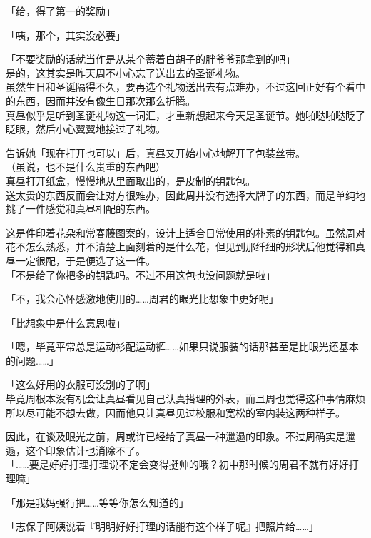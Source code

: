 「给，得了第一的奖励」

「咦，那个，其实没必要」

「不要奖励的话就当作是从某个蓄着白胡子的胖爷爷那拿到的吧」\\

是的，这其实是昨天周不小心忘了送出去的圣诞礼物。\\

虽然生日和圣诞隔得不久，要再选个礼物送出去有点难办，不过这回正好有个看中的东西，因而并没有像生日那次那么折腾。\\

真昼似乎是听到圣诞礼物这一词汇，才重新想起来今天是圣诞节。她啪哒啪哒眨了眨眼，然后小心翼翼地接过了礼物。

告诉她「现在打开也可以」后，真昼又开始小心地解开了包装丝带。\\

（虽说，也不是什么贵重的东西吧）\\

真昼打开纸盒，慢慢地从里面取出的，是皮制的钥匙包。\\

送太贵的东西反而会让对方很难办，因此周并没有选择大牌子的东西，而是单纯地挑了一件感觉和真昼相配的东西。

这是件印着花朵和常春藤图案的，设计上适合日常使用的朴素的钥匙包。虽然周对花不怎么熟悉，并不清楚上面刻着的是什么花，但见到那纤细的形状后他觉得和真昼一定很配，于是便选了这一件。\\

「不是给了你把多的钥匙吗。不过不用这包也没问题就是啦」

「不，我会心怀感激地使用的……周君的眼光比想象中更好呢」

「比想象中是什么意思啦」

「嗯，毕竟平常总是运动衫配运动裤……如果只说服装的话那甚至是比眼光还基本的问题……」

「这么好用的衣服可没别的了啊」\\

毕竟周根本没有机会让真昼看见自己认真搭理的外表，而且周也觉得这种事情麻烦所以尽可能不想去做，因而他只让真昼见过校服和宽松的室内装这两种样子。

因此，在谈及眼光之前，周或许已经给了真昼一种邋遢的印象。不过周确实是邋遢，这个印象估计也消除不了。\\

「……要是好好打理打理说不定会变得挺帅的哦？初中那时候的周君不就有好好打理嘛」

「那是我妈强行把……等等你怎么知道的」

「志保子阿姨说着『明明好好打理的话能有这个样子呢』把照片给……」

